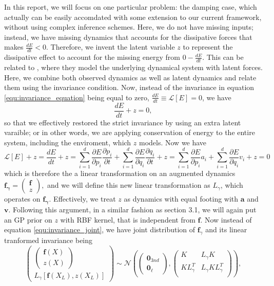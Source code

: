 \documentclass{statsmsc}
\begin{document}
In this report, we will focus on one particular problem: the damping case, which actually can be easily accomdated with some extension to our current framework, without using complex inference schemes.
Here, we do not have missing inputs; instead, we have missing dynamics that accounts for the dissipative forces that makes $\frac{dE}{dt}<0$. 
Therefore, we invent the latent variable $z$ to represent the dissipative effect to account for the missing energy from $0-\frac{dE}{dt}$.
This can be related to \cite{LatentForce}, where they model the underlying dynamical system with latent forces.
Here, we combine both observed dynamics as well as latent dynamics and relate them using the invariance condition. 
Now, instead of the invariance in equation \ref{equ:invariance_equation} being equal to zero, $\frac{dE}{dt}\equiv\mathcal{L}[E]=0$, we have $$\frac{dE}{dt}+z=0,$$ so that we effectively restored the strict invariance by using an extra latent varaible; or in other words, we are applying conservation of energy to the entire system, including the enviroment, which $z$ models.
Now we have 
\begin{equation}
\mathcal{L}[E] + z = \frac{dE}{dt} + z =\sum_{i=1}^d \frac{\partial E}{\partial p_i} \frac{\partial p_i}{\partial t}+ \sum_{i=1}^d\frac{\partial E}{\partial q_i}\frac{\partial q_i}{\partial t} + z = \sum_{i=1}^d \frac{\partial E}{\partial p_i} a_i + \sum_{i=1}^d\frac{\partial E}{\partial q_i} v_i + z=0
\label{equ:LEplusZ}
\end{equation}
which is therefore the a linear transformation on an augmented dynamics $\mathbf{f_\gamma}=\begin{pmatrix}
  \mathbf{f}\\z
\end{pmatrix},$
and we will define this new linear transformation as $L_\gamma$, which operates on $\mathbf{f_\gamma}.$
Effectively, we treat $z$ as dynamics with equal footing with $\mathbf{a}$ and $\mathbf{v}$.
Following this argument, in a similar fashion as section 3.1, we will again put an GP prior on $z$ with RBF kernel, that is independent from $\mathbf{f}$.
Now instead of equation \ref{equ:invariance_joint}, we have joint distribution of $\mathbf{f}_\gamma$ and its linear tranformed invariance being
\begin{equation}
\begin{pmatrix}
\begin{pmatrix}\mathbf{f}(X)\\ z(X)\end{pmatrix}\\L_\gamma[\mathbf{f}(X_L), z(X_L)]
\end{pmatrix}
\sim\mathcal{N}
\left(\begin{pmatrix}\mathbf{0}_{3nd}\\\mathbf{0}_{\ell}\end{pmatrix}, \begin{pmatrix}
    K & L_\gamma K \\
    KL_\gamma^T & L_\gamma KL_\gamma^T\\
\end{pmatrix}\right),
\label{equ:joint_withZ}
\end{equation}
\end{document}
